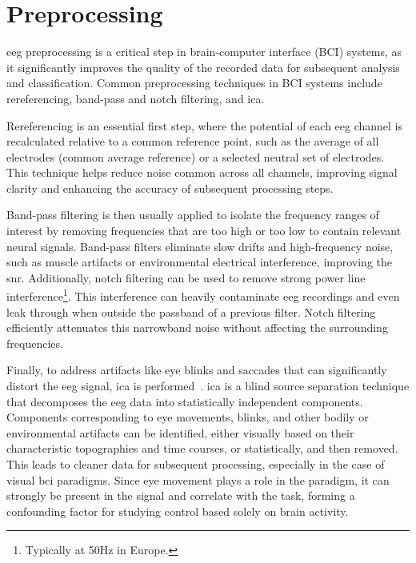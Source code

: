 \section{Preprocessing}
\label{sec:bci/preprocessing}

\ac{eeg} preprocessing is a critical step in brain-computer interface (BCI) systems, as
it significantly improves the quality of the recorded data for subsequent analysis and
classification.
Common preprocessing techniques in BCI systems include rereferencing, band-pass and
notch filtering, and \ac{ica}.

Rereferencing is an essential first step, where the potential of each \ac{eeg} channel
is recalculated relative to a common reference point, such as the average of all
electrodes (common average reference) or a selected neutral set of electrodes.
This technique helps reduce noise common across all channels, improving signal clarity
and enhancing the accuracy of subsequent processing steps.

Band-pass filtering is then usually applied to isolate the frequency ranges of interest
by removing frequencies that are too high or too low to contain relevant neural signals.
Band-pass filters eliminate slow drifts and high-frequency noise, such as muscle
artifacts or environmental electrical interference, improving the \ac{snr}.
Additionally, notch filtering can be used to remove strong power line interference\footnote{%
Typically at 50Hz in Europe.}.
This interference can heavily contaminate \ac{eeg} recordings and even leak through when
outside the passband of a previous filter.
Notch filtering efficiently attenuates this narrowband noise without affecting the
surrounding frequencies.

Finally, to address artifacts like eye blinks and saccades that can significantly
distort the \ac{eeg} signal, \ac{ica} is performed~\cite{Delorme2007}.
\ac{ica} is a blind source separation technique that decomposes the \ac{eeg} data into
statistically independent components.
Components corresponding to eye movements, blinks, and other bodily or environmental
artifacts can be identified, either visually based on their characteristic topographies
and time courses, or statistically, and then removed.
This leads to cleaner data for subsequent processing, especially in the case of visual
\ac{bci} paradigms.
Since eye movement plays a role in the paradigm, it can strongly be present in the
signal and correlate with the task, forming a confounding factor for studying control
based solely on brain activity.


